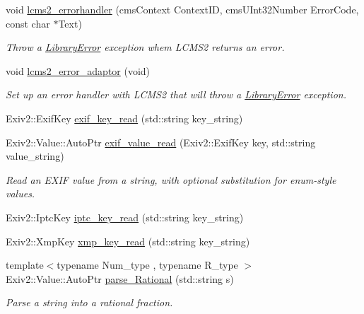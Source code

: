 \begin{DoxyCompactItemize}
void \hyperlink{namespace_photo_finish_a71314be170f2dca10314de93daf4ce95}{lcms2\+\_\+errorhandler} (cms\+Context Context\+ID, cms\+U\+Int32\+Number Error\+Code, const char $\ast$Text)
\begin{DoxyCompactList}\small\item\em Throw a \hyperlink{class_photo_finish_1_1_library_error}{Library\+Error} exception whem L\+C\+M\+S2 returns an error. \end{DoxyCompactList}\item 
void \hyperlink{namespace_photo_finish_a4edeb3213c7dd0a8bf93499914dbf65f}{lcms2\+\_\+error\+\_\+adaptor} (void)
\begin{DoxyCompactList}\small\item\em Set up an error handler with L\+C\+M\+S2 that will throw a \hyperlink{class_photo_finish_1_1_library_error}{Library\+Error} exception. \end{DoxyCompactList}\item 
Exiv2\+::\+Exif\+Key \hyperlink{namespace_photo_finish_a0b89b01a1b60b5e7c02fa92d001d9872}{exif\+\_\+key\+\_\+read} (std\+::string key\+\_\+string)
\item 
Exiv2\+::\+Value\+::\+Auto\+Ptr \hyperlink{namespace_photo_finish_a26b48907e51881629189963d62678563}{exif\+\_\+value\+\_\+read} (Exiv2\+::\+Exif\+Key key, std\+::string value\+\_\+string)
\begin{DoxyCompactList}\small\item\em Read an E\+X\+IF value from a string, with optional substitution for enum-\/style values. \end{DoxyCompactList}\item 
Exiv2\+::\+Iptc\+Key \hyperlink{namespace_photo_finish_ace8601eea326d5b9f2f5af7b1aa10253}{iptc\+\_\+key\+\_\+read} (std\+::string key\+\_\+string)
\item 
Exiv2\+::\+Xmp\+Key \hyperlink{namespace_photo_finish_a54ed3d9f6f4c8014b374ef85f29182d0}{xmp\+\_\+key\+\_\+read} (std\+::string key\+\_\+string)
\item 
{\footnotesize template$<$typename Num\+\_\+type , typename R\+\_\+type $>$ }\\Exiv2\+::\+Value\+::\+Auto\+Ptr \hyperlink{namespace_photo_finish_a61d5056e25d8cc76ff69e9a2e3782c76}{parse\+\_\+\+Rational} (std\+::string s)
\begin{DoxyCompactList}\small\item\em Parse a string into a rational fraction. \end{DoxyCompactList}\end{DoxyCompactItemize}

